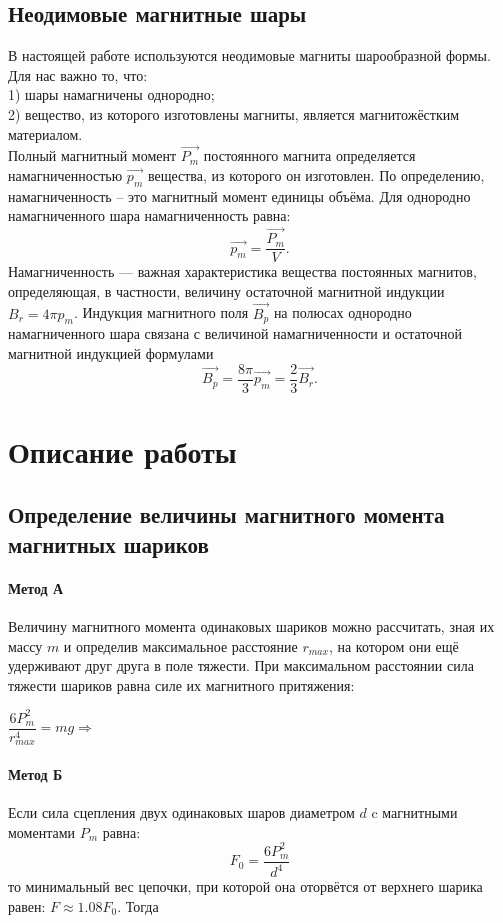 \documentclass[a4paper,12pt]{article}
\begin{document}
\subsection*{Неодимовые магнитные шары}
В настоящей работе используются неодимовые магниты шарообразной формы.
Для нас важно то, что:\\
1) шары намагничены однородно;\\
2) вещество, из которого изготовлены магниты, является магнитожёстким материалом.\\
Полный магнитный момент $\overrightarrow{P_m}$
постоянного магнита определяется намагниченностью $\overrightarrow{p_m}$
вещества, из которого он изготовлен. По определению, намагниченность – это магнитный момент единицы объёма. Для однородно намагниченного шара намагниченность равна:
$$
\overrightarrow{p_m}=\dfrac{\overrightarrow{P_m}}{V}.
$$
Намагниченность — важная характеристика вещества постоянных магнитов, определяющая, в
частности, величину остаточной магнитной индукции $B_r = 4\pi p_m$. Индукция магнитного поля $\overrightarrow{B_p}$
на полюсах однородно намагниченного шара связана с величиной намагниченности и остаточной магнитной индукцией формулами
$$
\overrightarrow{B_p}=\dfrac{8\pi}{3}\overrightarrow{p_m}=\dfrac{2}{3}\overrightarrow{B_r}.
$$
\section*{Описание работы}
\subsection*{Определение величины магнитного момента магнитных шариков}
\paragraph*{Метод А}
Величину магнитного момента одинаковых шариков
можно рассчитать, зная их массу $m$ и определив максимальное расстояние $r_{max}$, на котором они ещё удерживают друг
друга в поле тяжести. При максимальном расстоянии сила тяжести шариков равна силе их магнитного притяжения:
\begin{center}
$\dfrac{6P_m^2}{r_{max}^4}=mg\Rightarrow$ 
\end{center}
\paragraph*{Метод Б}
Если сила сцепления двух одинаковых шаров диаметром $d$ c магнитными моментами $P_m$ равна:
$$
F_0 = \dfrac{6P_m^2}{d^4}
$$
то минимальный вес цепочки, при которой она оторвётся от верхнего шарика равен: $F \approx 1.08 F_0$. Тогда\\
\begin{center}
\end{center}
\end{document}
